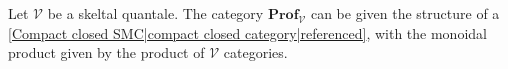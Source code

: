 
Let $\mathcal{V}$ be a skeltal quantale. The category $\mathbf{Prof}_\mathcal{V}$ can be given the structure of a \ref{Compact closed SMC|compact closed category|referenced}, with the monoidal product given by the product of $\mathcal{V}$ categories.